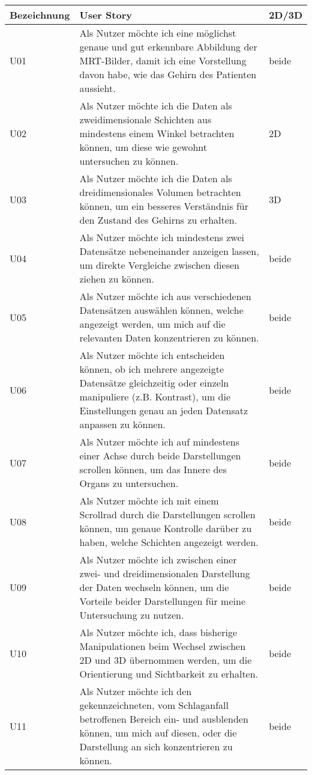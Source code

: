 \begin{longtable}{p{}p{}p{}}
\toprule
Bezeichnung & User Story & 2D/3D \\
\toprule
U01 & Als Nutzer möchte ich eine möglichst genaue und gut erkennbare Abbildung der MRT-Bilder, damit ich eine Vorstellung davon habe, wie das Gehirn des Patienten aussieht. & beide\\
\midrule 
U02 & Als Nutzer möchte ich die Daten als zweidimensionale Schichten aus mindestens einem Winkel betrachten können, um diese wie gewohnt untersuchen zu können.  & 2D\\
\midrule 
U03 & Als Nutzer möchte ich die Daten als dreidimensionales Volumen betrachten können, um ein besseres Verständnis für den Zustand des Gehirns zu erhalten. & 3D\\
\midrule 
U04 & Als Nutzer möchte ich mindestens zwei Datensätze nebeneinander anzeigen lassen, um direkte Vergleiche zwischen diesen ziehen zu können. & beide\\
\midrule 
U05 & Als Nutzer möchte ich aus verschiedenen Datensätzen auswählen können, welche angezeigt werden, um mich auf die relevanten Daten konzentrieren zu können. & beide\\
\midrule
U06 & Als Nutzer möchte ich entscheiden können, ob ich mehrere angezeigte Datensätze gleichzeitig oder einzeln manipuliere (z.B. Kontrast), um die Einstellungen genau an jeden Datensatz anpassen zu können. & beide\\
\midrule 
U07 & Als Nutzer möchte ich auf mindestens einer Achse durch beide Darstellungen scrollen können, um das Innere des Organs zu untersuchen. & beide \\
\midrule 
U08 & Als Nutzer möchte ich mit einem Scrollrad durch die Darstellungen scrollen können, um genaue Kontrolle darüber zu haben, welche Schichten angezeigt werden. & beide\\
\midrule 
U09 & Als Nutzer möchte ich zwischen einer zwei- und dreidimensionalen Darstellung der Daten wechseln können, um die Vorteile beider Darstellungen für meine Untersuchung zu nutzen. & beide\\
\midrule 
U10 & Als Nutzer möchte ich, dass bisherige Manipulationen beim Wechsel zwischen 2D und 3D übernommen werden, um die Orientierung und Sichtbarkeit zu erhalten. & beide\\
\midrule 
U11  & Als Nutzer möchte ich den gekennzeichneten, vom Schlaganfall betroffenen Bereich ein- und ausblenden können, um mich auf diesen, oder die Darstellung an sich konzentrieren zu können. & beide\\

\end{longtable}
